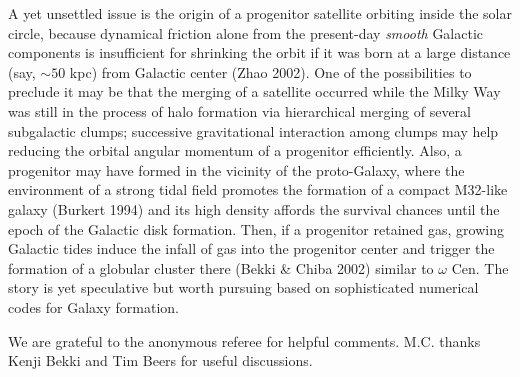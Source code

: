 \documentclass[preprint,12pt]{aastex}
\begin{document}
A yet unsettled issue is the origin of a progenitor satellite
orbiting inside the solar circle, because dynamical friction alone from the
present-day {\it smooth} Galactic components is insufficient for shrinking the
orbit if it was born at a large distance (say, $\sim 50$ kpc) from Galactic
center (Zhao 2002). One of the possibilities to preclude it
may be that the merging of a satellite occurred while
the Milky Way was still in the process of halo formation via
hierarchical merging of several subgalactic clumps; successive gravitational
interaction among clumps may help reducing the orbital angular momentum of
a progenitor efficiently. Also, a progenitor may have formed
in the vicinity of the proto-Galaxy, where the environment of a strong tidal
field promotes the formation of a compact M32-like galaxy (Burkert 1994)
and its high density affords the survival chances until
the epoch of the Galactic disk formation. Then, if a progenitor retained
gas, growing Galactic tides induce the infall of gas into the
progenitor center and trigger the formation of a globular cluster
there (Bekki \& Chiba 2002) similar to $\omega$ Cen. The story is yet
speculative but worth pursuing based on sophisticated numerical codes for
Galaxy formation.


\acknowledgments
We are grateful to the anonymous referee for helpful comments.
M.C. thanks Kenji Bekki and Tim Beers for useful discussions.

\end{document}
